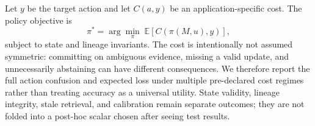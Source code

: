 Let $y$ be the target action and let $C(a,y)$ be an application-specific cost.
The policy objective is
\begin{equation}
\pi^* = \arg\min_\pi\;\mathbb{E}[C(\pi(M,u),y)],
\end{equation}
subject to state and lineage invariants. The cost is intentionally not assumed
symmetric: committing on ambiguous evidence, missing a valid update, and
unnecessarily abstaining can have different consequences. We therefore report
the full action confusion and expected loss under multiple pre-declared cost
regimes rather than treating accuracy as a universal utility. State validity,
lineage integrity, stale retrieval, and calibration remain separate outcomes;
they are not folded into a post-hoc scalar chosen after seeing test results.
